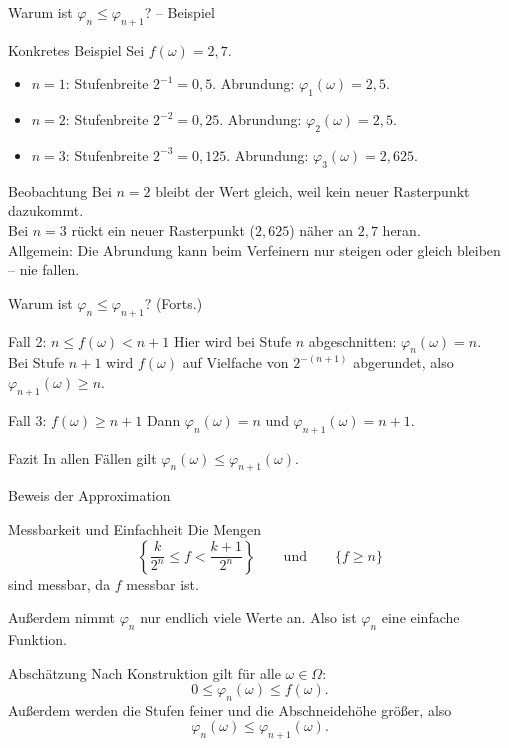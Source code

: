 \documentclass{beamer}
\begin{document}
\begin{frame}{Warum ist \(\varphi_n\le\varphi_{n+1}\)? -- Beispiel}
\begin{block}{Konkretes Beispiel}
Sei \(f(\omega)=2{,}7\).
\begin{itemize}
    \item \(n=1\): Stufenbreite \(2^{-1}=0{,}5\). Abrundung: \(\varphi_1(\omega)=2{,}5\).
    \item \(n=2\): Stufenbreite \(2^{-2}=0{,}25\). Abrundung: \(\varphi_2(\omega)=2{,}5\).
    \item \(n=3\): Stufenbreite \(2^{-3}=0{,}125\). Abrundung: \(\varphi_3(\omega)=2{,}625\).
\end{itemize}
\end{block}

\begin{block}{Beobachtung}
Bei \(n=2\) bleibt der Wert gleich, weil kein neuer Rasterpunkt dazukommt.
\\
Bei \(n=3\) rückt ein neuer Rasterpunkt (\(2{,}625\)) näher an \(2{,}7\) heran.
\\[4pt]
Allgemein: Die Abrundung kann beim Verfeinern nur steigen oder gleich bleiben -- nie fallen.
\end{block}
\end{frame}

\begin{frame}{Warum ist \(\varphi_n\le\varphi_{n+1}\)? (Forts.)}
\begin{block}{Fall 2: \(n\le f(\omega)<n+1\)}
Hier wird bei Stufe \(n\) abgeschnitten: \(\varphi_n(\omega)=n\).
\\
Bei Stufe \(n+1\) wird \(f(\omega)\) auf Vielfache von \(2^{-(n+1)}\) abgerundet, also \(\varphi_{n+1}(\omega)\ge n\).
\end{block}

\begin{block}{Fall 3: \(f(\omega)\ge n+1\)}
Dann \(\varphi_n(\omega)=n\) und \(\varphi_{n+1}(\omega)=n+1\).
\end{block}

\begin{block}{Fazit}
In allen Fällen gilt \(\varphi_n(\omega)\le \varphi_{n+1}(\omega)\).
\end{block}
\end{frame}

\begin{frame}[shrink=5]{Beweis der Approximation}
\begin{block}{Messbarkeit und Einfachheit}
Die Mengen
\[
\left\{
\frac{k}{2^n}\le f<\frac{k+1}{2^n}
\right\}
\qquad\text{und}\qquad
\{f\ge n\}
\]
sind messbar, da \(f\) messbar ist.

Außerdem nimmt \(\varphi_n\) nur endlich viele Werte an. Also ist \(\varphi_n\) eine einfache Funktion.
\end{block}

\begin{block}{Abschätzung}
Nach Konstruktion gilt für alle \(\omega\in\Omega\):
\[
0\le \varphi_n(\omega)\le f(\omega).
\]
Außerdem werden die Stufen feiner und die Abschneidehöhe größer, also
\[
\varphi_n(\omega)\le \varphi_{n+1}(\omega).
\]
\end{block}
\end{frame}
\end{document}
